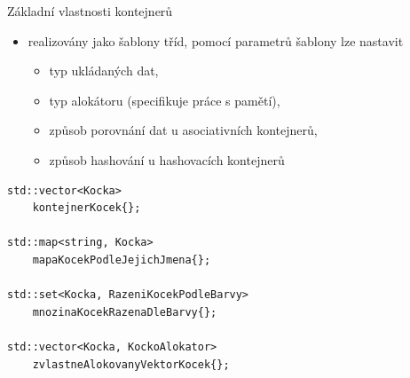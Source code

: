 \begin{frame}[fragile]
\begin{block}{Základní vlastnosti kontejnerů}
\begin{itemize}
\item realizovány jako šablony tříd, pomocí parametrů šablony lze nastavit
\begin{itemize}
\item typ ukládaných dat,
\item typ alokátoru (specifikuje práce s pamětí),
\item způsob porovnání dat u asociativních kontejnerů,
\item způsob hashování u hashovacích kontejnerů
\end{itemize}
\end{itemize}
\end{block}

\begin{yesblock}
\begin{lstlisting}[basicstyle=\small]
std::vector<Kocka> 
	kontejnerKocek{};

std::map<string, Kocka> 
	mapaKocekPodleJejichJmena{};

std::set<Kocka, RazeniKocekPodleBarvy>
	mnozinaKocekRazenaDleBarvy{};

std::vector<Kocka, KockoAlokator> 
	zvlastneAlokovanyVektorKocek{};
\end{lstlisting}
\end{yesblock}
\end{frame}








